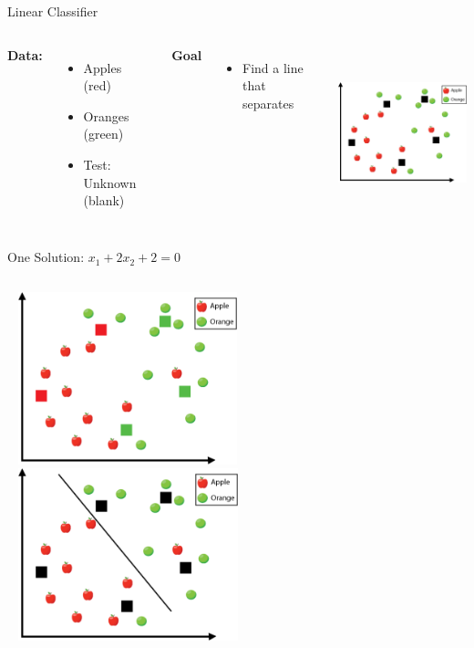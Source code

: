 \documentclass[aspectratio=169, 14pt,usenames,dvipsnames]{beamer}
\begin{document}
\begin{frame}{Linear Classifier}
\begin{columns}
	\textbf{\alert{Data:}}
\begin{itemize}
\item Apples (red)
\item Oranges (green)
\item Test: Unknown (blank)
\end{itemize} 
\textbf{\alert{Goal}}
\begin{itemize}
\item Find a line that separates
\end{itemize}

\includegraphics[width=7cm,height=5cm]{Images/4lcla.png}
\end{columns}
\end{frame}



\begin{frame}{One Solution: $x_1 + 2x_2 + 2 = 0$}
\begin{columns}
\includegraphics[width=7cm,height=5cm]{Images/5lcla.png}
\includegraphics[width=7cm,height=5cm]{Images/5alcla.png}
\end{columns}
\end{frame}
\end{document}
